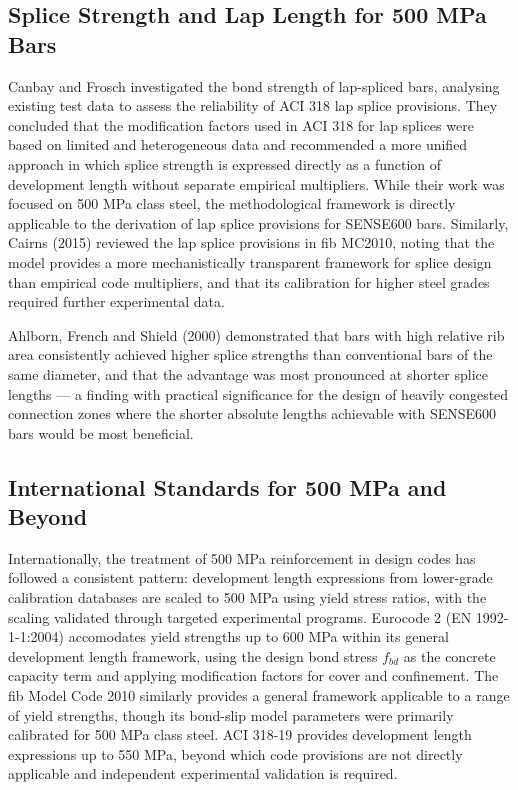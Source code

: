 \subsection{Splice Strength and Lap Length for 500 MPa Bars}

Canbay and Frosch investigated the bond strength of lap-spliced bars, analysing existing test data to assess the reliability of ACI 318 lap splice provisions. They concluded that the modification factors used in ACI 318 for lap splices were based on limited and heterogeneous data and recommended a more unified approach in which splice strength is expressed directly as a function of development length without separate empirical multipliers. While their work was focused on 500 MPa class steel, the methodological framework is directly applicable to the derivation of lap splice provisions for SENSE600 bars. Similarly, Cairns (2015) reviewed the lap splice provisions in fib MC2010, noting that the model provides a more mechanistically transparent framework for splice design than empirical code multipliers, and that its calibration for higher steel grades required further experimental data.

Ahlborn, French and Shield (2000) demonstrated that bars with high relative rib area consistently achieved higher splice strengths than conventional bars of the same diameter, and that the advantage was most pronounced at shorter splice lengths — a finding with practical significance for the design of heavily congested connection zones where the shorter absolute lengths achievable with SENSE600 bars would be most beneficial.

\subsection{International Standards for 500 MPa and Beyond}
Internationally, the treatment of 500 MPa reinforcement in design codes has followed a consistent pattern: development length expressions from lower-grade calibration databases are scaled to 500 MPa using yield stress ratios, with the scaling validated through targeted experimental programs. Eurocode 2 (EN 1992-1-1:2004) accomodates yield strengths up to 600 MPa within its general development length framework, using the design bond stress $f_{bd}$ as the concrete capacity term and applying modification factors for cover and confinement. The fib Model Code 2010 similarly provides a general framework applicable to a range of yield strengths, though its bond-slip model parameters were primarily calibrated for 500 MPa class steel. ACI 318-19 provides development length expressions up to 550 MPa, beyond which code provisions are not directly applicable and independent experimental validation is required.

